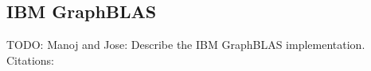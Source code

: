 \subsection{IBM GraphBLAS}


TODO: Manoj and Jose: Describe the IBM GraphBLAS implementation. Citations:\cite{gpi2016,GPI}

